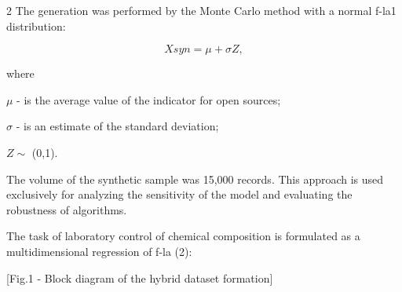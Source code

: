 \begin{multicols}{2}
The generation was performed by the Monte Carlo method with a normal
f-la1 distribution:

\begin{equation}
Xsyn=\mu+\sigma Z,
\end{equation}

where

\(\mu\) - is the average value of the indicator for open sources;

\(\sigma\) - is an estimate of the standard deviation;

\(Z∼\) (0,1).

The volume of the synthetic sample was 15,000 records. This approach is
used exclusively for analyzing the sensitivity of the model and
evaluating the robustness of algorithms.

The task of laboratory control of chemical composition is formulated as
a multidimensional regression of f-la (2):
\end{multicols}

[Fig.1 - Block diagram of the hybrid dataset formation]

